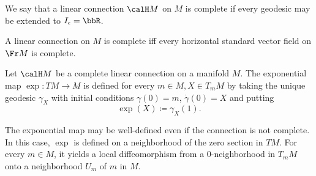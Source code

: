 We say that a linear connection $\calH M$ on $M$ is complete if every geodesic may be extended to $I_\epsilon=\bbR$.

\begin{cor}[{{\cite[Cor.~2.1.24]{RS2}}}]\label{cor 2.1.24 RS2}
    A linear connection on $M$ is complete iff every horizontal standard vector field on $\Fr M$ is complete.
\end{cor}


\begin{defn}
    Let $\calH M$ be a complete linear connection on a manifold $M$. The exponential map $\exp: TM\to M$ is defined for every $m\in M, X\in T_mM$ by taking the unique geodesic $\gamma_X$ with initial conditions $\gamma(0)=m$, $\dot\gamma(0)=X$ and putting 
    \[\exp(X)\coloneqq \gamma_X(1).\]
\end{defn}

\begin{rem}
    The exponential map may be well-defined even if the connection is not complete. In this case, $\exp$ is defined on a neighborhood of the zero section in $TM$. For every $m\in M$, it yields a local diffeomorphism from a $0$-neighborhood in $T_m M$ onto a neighborhood $U_m$ of $m$ in $M$.
\end{rem}



